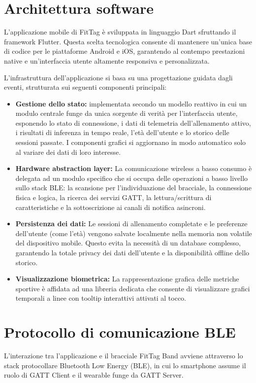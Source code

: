 \section{Architettura software}
L'applicazione mobile di FitTag è sviluppata in linguaggio Dart sfruttando il framework Flutter. 
Questa scelta tecnologica consente di mantenere un'unica base di codice per le piattaforme Android e iOS, garantendo al contempo prestazioni native e un'interfaccia utente altamente responsiva e personalizzata.

L'infrastruttura dell'applicazione si basa su una progettazione guidata dagli eventi, strutturata sui seguenti componenti principali:
\begin{itemize}
    \item \textbf{Gestione dello stato:} implementata secondo un modello reattivo in cui un modulo centrale funge da unica sorgente di verità per l'interfaccia utente, esponendo lo stato di connessione, i dati di telemetria dell'allenamento attivo, i risultati di inferenza in tempo reale, l'età dell'utente e lo storico delle sessioni passate. I componenti grafici si aggiornano in modo automatico solo al variare dei dati di loro interesse.
    \item \textbf{Hardware abstraction layer:} La comunicazione wireless a basso consumo è delegata ad un modulo specifico che si occupa delle operazioni a basso livello sullo stack BLE: la scansione per l'individuazione del bracciale, la connessione fisica e logica, la ricerca dei servizi GATT, la lettura/scrittura di caratteristiche e la sottoscrizione ai canali di notifica asincroni.
    \item \textbf{Persistenza dei dati:} Le sessioni di allenamento completate e le preferenze dell'utente (come l'età) vengono salvate localmente nella memoria non volatile del dispositivo mobile. Questo evita la necessità di un database complesso, garantendo la totale privacy dei dati dell'utente e la disponibilità offline dello storico.
    \item \textbf{Visualizzazione biometrica:} La rappresentazione grafica delle metriche sportive è affidata ad una libreria dedicata che consente di visualizzare grafici temporali a linee con tooltip interattivi attivati al tocco.
\end{itemize}

\section{Protocollo di comunicazione BLE}
L'interazione tra l'applicazione e il bracciale FitTag Band avviene attraverso lo stack protocollare Bluetooth Low Energy (BLE), in cui lo smartphone assume il ruolo di GATT Client e il wearable funge da GATT Server.


